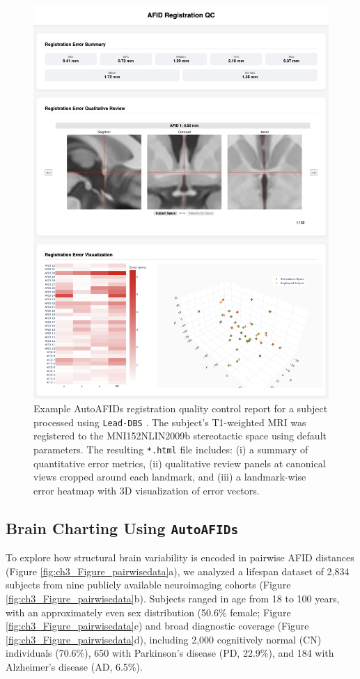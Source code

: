 \begin{figure}[hbt!]
    \centering
    \includegraphics[width=0.80\linewidth]{figs/figuresupregqc.png}
    \caption{Example AutoAFIDs registration quality control report for a subject processed using \texttt{Lead-DBS} \cite{Neudorfer2023-wd}. The subject’s T1-weighted MRI was registered to the MNI152NLIN2009b stereotactic space using default parameters. The resulting \texttt{*.html} file includes: (i) a summary of quantitative error metrics, (ii) qualitative review panels at canonical views cropped around each landmark, and (iii) a landmark-wise error heatmap with 3D visualization of error vectors.}
    \label{fig:figuresupregqc}
\end{figure}

\subsection{Brain Charting Using \texttt{AutoAFIDs}}

To explore how structural brain variability is encoded in pairwise AFID distances (Figure \ref{fig:ch3_Figure_pairwisedata}a), we analyzed a lifespan dataset of 2,834 subjects from nine publicly available neuroimaging cohorts (Figure \ref{fig:ch3_Figure_pairwisedata}b). Subjects ranged in age from 18 to 100 years, with an approximately even sex distribution (50.6\% female; Figure \ref{fig:ch3_Figure_pairwisedata}c) and broad diagnostic coverage (Figure \ref{fig:ch3_Figure_pairwisedata}d), including 2,000 cognitively normal (CN) individuals (70.6\%), 650 with Parkinson’s disease (PD, 22.9\%), and 184 with Alzheimer’s disease (AD, 6.5\%).

